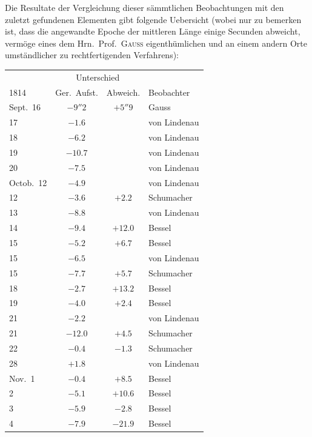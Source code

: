 \par\indent Die Resultate der Vergleichung dieser sämmtlichen Beobachtungen mit den zuletzt gefundenen Elementen gibt folgende Uebersicht (wobei nur zu bemerken ist, dass die angewandte Epoche der mittleren Länge einige Secunden abweicht, vermöge eines dem Hrn.\ Prof.\ \textsc{Gauss} eigenthümlichen und an einem andern Orte umständlicher zu rechtfertigenden Verfahrens):

\begin{center}
\fontsize{10}{12}\selectfont\setlength{\tabcolsep}{5pt}\renewcommand{\arraystretch}{1.15}\begin{tabular}{l|cc|l}
 & \multicolumn{2}{c|}{Unterschied} & \\
1814 & Ger.\ Aufst. & Abweich. & Beobachter \\
\hline
Sept.\ 16 & $-9''2$ & $+5''9$ & Gauss \\
17 & $-1.6$ & & von Lindenau \\
18 & $-6.2$ & & von Lindenau \\
19 & $-10.7$ & & von Lindenau \\
20 & $-7.5$ & & von Lindenau \\
Octob.\ 12 & $-4.9$ & & von Lindenau \\
12 & $-3.6$ & $+2.2$ & Schumacher \\
13 & $-8.8$ & & von Lindenau \\
14 & $-9.4$ & $+12.0$ & Bessel \\
15 & $-5.2$ & $+6.7$ & Bessel \\
15 & $-6.5$ & & von Lindenau \\
15 & $-7.7$ & $+5.7$ & Schumacher \\
18 & $-2.7$ & $+13.2$ & Bessel \\
19 & $-4.0$ & $+2.4$ & Bessel \\
21 & $-2.2$ & & von Lindenau \\
21 & $-12.0$ & $+4.5$ & Schumacher \\
22 & $-0.4$ & $-1.3$ & Schumacher \\
28 & $+1.8$ & & von Lindenau \\
Nov.\ 1 & $-0.4$ & $+8.5$ & Bessel \\
2 & $-5.1$ & $+10.6$ & Bessel \\
3 & $-5.9$ & $-2.8$ & Bessel \\
4 & $-7.9$ & $-21.9$ & Bessel \\
\end{tabular}
\end{center}

